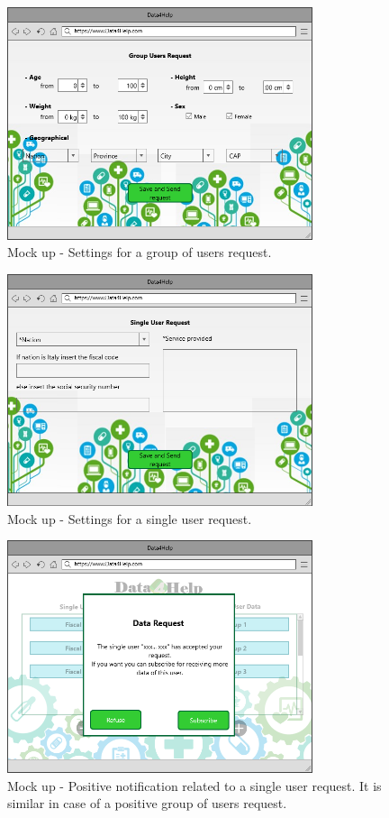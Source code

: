 \FloatBarrier
\begin{figure}[h!]
	\centering
	\includegraphics[width=0.80\textwidth]{./pictures/group_request.png}\par
	\caption{Mock up - Settings for a group of users request.}
\end{figure}
\FloatBarrier
\begin{figure}[h!]
	\centering
	\includegraphics[width=0.80\textwidth]{./pictures/single_request.png}\par
	\caption{Mock up - Settings for a single user request.}
\end{figure}
\FloatBarrier
\begin{figure}[h!]
	\centering
	\includegraphics[width=0.80\textwidth]{./pictures/positive_request.png}\par
	\caption{Mock up - Positive notification related to a single user request. It is similar in case of a positive group of users request.}
\end{figure}
